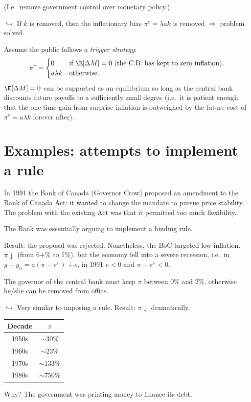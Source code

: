 \documentclass[11pt]{article}
\begin{document}
(I.e.\ remove government control over monetary policy.)

$\hookrightarrow$ If $k$ is removed, then the inflationary bias $\pi^e=\lambda ak$ is
removed $\Rightarrow$ problem solved.

Assume the public follows a \emph{trigger strategy}:
\[
  \pi^e=\begin{cases}
    0 & \text{if } \E[\Delta M]=0 \text{ (the C.B.\ has kept to zero inflation)},\\
    a\lambda k & \text{otherwise.}
  \end{cases}
\]
$\E[\Delta M]=0$ can be supported as an equilibrium so long as the central bank discounts
future payoffs to a sufficiently small degree (i.e.\ it is patient enough that the
one-time gain from surprise inflation is outweighed by the future cost of $\pi^e=a\lambda
k$ forever after).


\section{Examples: attempts to implement a rule}

In 1991 the Bank of Canada (Governor Crow) proposed an amendment to the Bank of Canada
Act: it wanted to change the mandate to pursue price stability. The problem with the
existing Act was that it permitted too much flexibility.
\begin{flatlist}
  \item The Bank was essentially arguing to implement a binding rule.
  \item Result: the proposal was rejected. Nonetheless, the BoC targeted low inflation.
        $\pi\downarrow$ (from 6+\% to 1\%), but the economy fell into a severe recession,
        i.e.\ in $y-y_n=a(\pi-\pi^e)+e$, in 1991 $e<0$ and $\pi-\pi^e<0$.
\end{flatlist}

The governor of the central bank must keep $\pi$ between 0\% and 2\%, otherwise he/she
can be removed from office.

$\hookrightarrow$ Very similar to imposing a rule. Result: $\pi\downarrow$ dramatically.

\begin{center}
\begin{tabular}{cc}
  Decade & $\pi$ \\ \hline
  1950s & $\sim 30\%$ \\
  1960s & $\sim 23\%$ \\
  1970s & $\sim 133\%$ \\
  1980s & $\sim 750\%$
\end{tabular}
\qquad
\begin{minipage}{0.38\textwidth}
  Why? The government was printing money to finance its debt.
\end{minipage}
\end{center}
\end{document}
